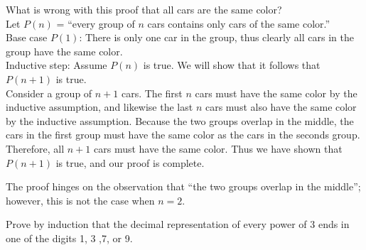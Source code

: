 \documentclass[solution, letterpaper]{cs20}
\begin{document}
        \problem{}{}

        What is wrong with this proof that all cars are the same color?\\

        Let $P(n)$ = ``every group of $n$ cars contains only cars of the same color.''\\
        Base case $P(1)$: There is only one car in the group, thus clearly all cars in the group have the same color. \\
        Inductive step: Assume $P(n)$ is true. We will show that it follows that $P(n+1)$ is true. \\
        Consider a group of $n+1$ cars. The first $n$ cars must have the same color by the inductive assumption, and likewise the last $n$ cars must also have the same color by the inductive assumption. Because the two groups overlap in the middle, the cars in the first group must have the same color as the cars in the seconds group. Therefore, all $n+1$ cars must have the same color. Thus we have shown that $P(n+1)$ is true, and our proof is complete.

        \begin{solution}

        The proof hinges on the observation that ``the two groups overlap in the middle''; however, this is not the case when $n = 2$.

        \end{solution}

        \problem{}{}

        Prove by induction that the decimal representation of every power of $3$ ends in one of the digits 1, 3 ,7, or 9.
\end{document}
